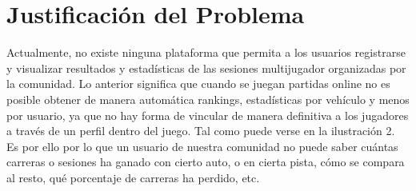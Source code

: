 \section{Justificación del Problema}
Actualmente, no existe ninguna plataforma que permita a los usuarios registrarse y visualizar resultados y estadísticas de las sesiones multijugador organizadas por la comunidad. Lo anterior significa que cuando se juegan partidas online no es posible obtener de manera automática rankings, estadísticas por vehículo y menos por usuario, ya que no hay forma de vincular de manera definitiva a los jugadores a través de un perfil dentro del juego. Tal como puede verse en la ilustración 2. Es por ello por lo que un usuario de nuestra comunidad no puede saber cuántas carreras o sesiones ha ganado con cierto auto, o en cierta pista, cómo se compara al resto, qué porcentaje de carreras ha perdido, etc.



